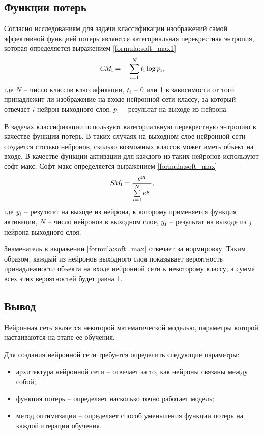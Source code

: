 \subsection{Функции потерь}
Согласно исследованиям \cite{loss_function} для задачи классификации изображений самой эффективной функцией потерь являются категориальная перекрестная энтропия, которая определяется выражением \ref{formula:soft_max1}
\begin{equation}\label{formula:soft_max1}
C\!M_{\rm{i}} = - \sum\limits_{i = 1}^{N}t_{\rm{i}}\log{p_{\rm{i}}},
\end{equation}
где $N$ -- число классов классификации, $t_{\rm{i}}$ -- 0 или 1 в зависимости от того принадлежит ли изображение на входе нейронной сети классу, за который отвечает $i$ нейрон выходного слоя, $p_{\rm{i}}$ -- результат на выходе из нейрона.

В задачах классификации используют категориальную перекрестную энтропию в качестве функции потерь. В таких случаях на выходном слое нейронной сети создается столько нейронов, сколько возможных классов может иметь объект на входе. В качестве функции активации для каждого из таких нейронов используют софт макс. Софт макс определяется выражением \ref{formula:soft_max}
\begin{equation}\label{formula:soft_max}
S\!M_{\rm{i}} = \frac{e^{y_{\rm{i}}}}{\sum\limits_{i = 1}^{N}e^{y_{\rm{j}}}},
\end{equation}
где $y_{\rm{i}}$ -- результат на выходе из нейрона, к которому применяется функция активации, $N$ -- число нейронов в выходном слое, $y_{\rm{j}}$ -- результат на выходе из $j$ нейрона выходного слоя.

Знаменатель в выражении \ref{formula:soft_max} отвечает за нормировку. Таким образом, каждый из нейронов выходного слоя показывает вероятность принадлежности объекта на входе нейронной сети к некоторому классу, а сумма всех этих вероятностей будет равна 1.

\subsection{Вывод}
Нейронная сеть является некоторой математической моделью, параметры которой настаиваются на этапе ее обучения.

Для создания нейронной сети требуется определить следующие параметры:
\begin{itemize}
	\item архитектура нейронной сети -- отвечает за то, как нейроны связаны между собой;
	\item функция потерь -- определяет насколько точно работает модель;
	\item метод оптимизации -- определяет способ уменьшения функции потерь на каждой итерации обучения.
\end{itemize}

